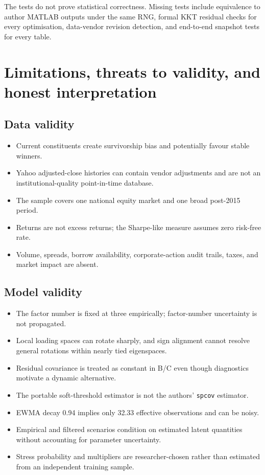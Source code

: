 \documentclass[11pt,a4paper]{article}
\newcommand{\code}[1]{\texttt{#1}}
\begin{document}
The tests do not prove statistical correctness. Missing tests include equivalence to author MATLAB outputs under the same RNG, formal KKT residual checks for every optimisation, data-vendor revision detection, and end-to-end snapshot tests for every table.

\section{Limitations, threats to validity, and honest interpretation}

\subsection{Data validity}

\begin{itemize}
  \item Current constituents create survivorship bias and potentially favour stable winners.
  \item Yahoo adjusted-close histories can contain vendor adjustments and are not an institutional-quality point-in-time database.
  \item The sample covers one national equity market and one broad post-2015 period.
  \item Returns are not excess returns; the Sharpe-like measure assumes zero risk-free rate.
  \item Volume, spreads, borrow availability, corporate-action audit trails, taxes, and market impact are absent.
\end{itemize}

\subsection{Model validity}

\begin{itemize}
  \item The factor number is fixed at three empirically; factor-number uncertainty is not propagated.
  \item Local loading spaces can rotate sharply, and sign alignment cannot resolve general rotations within nearly tied eigenspaces.
  \item Residual covariance is treated as constant in B/C even though diagnostics motivate a dynamic alternative.
  \item The portable soft-threshold estimator is not the authors' \code{spcov} estimator.
  \item EWMA decay 0.94 implies only 32.33 effective observations and can be noisy.
  \item Empirical and filtered scenarios condition on estimated latent quantities without accounting for parameter uncertainty.
  \item Stress probability and multipliers are researcher-chosen rather than estimated from an independent training sample.
\end{itemize}
\end{document}
